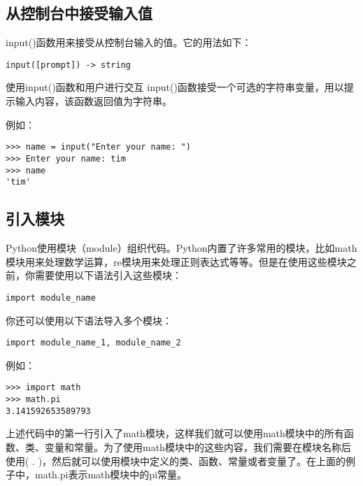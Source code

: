 \subsection{从控制台中接受输入值}
input()函数用来接受从控制台输入的值。它的用法如下：

\begin{lstlisting}
input([prompt]) -> string
\end{lstlisting}

\begin{myremark}{使用input()函数和用户进行交互}
input()函数接受一个可选的字符串变量，用以提示输入内容，该函数返回值为字符串。
\end{myremark}

例如：

\begin{lstlisting}
>>> name = input("Enter your name: ")
>>> Enter your name: tim
>>> name
'tim'
\end{lstlisting}

\subsection{引入模块}
Python使用模块（module）组织代码。Python内置了许多常用的模块，比如math模块用来处理数学运算，re模块用来处理正则表达式等等。但是在使用这些模块之前，你需要使用以下语法引入这些模块：

\begin{lstlisting}
import module_name
\end{lstlisting}

你还可以使用以下语法导入多个模块：

\begin{lstlisting}
import module_name_1, module_name_2
\end{lstlisting}

例如：

\begin{lstlisting}
>>> import math
>>> math.pi
3.141592653589793
\end{lstlisting}

上述代码中的第一行引入了math模块，这样我们就可以使用math模块中的所有函数、类、变量和常量。为了使用math模块中的这些内容，我们需要在模块名称后使用( . )，然后就可以使用模块中定义的类、函数、常量或者变量了。在上面的例子中，math.pi表示math模块中的pi常量。
